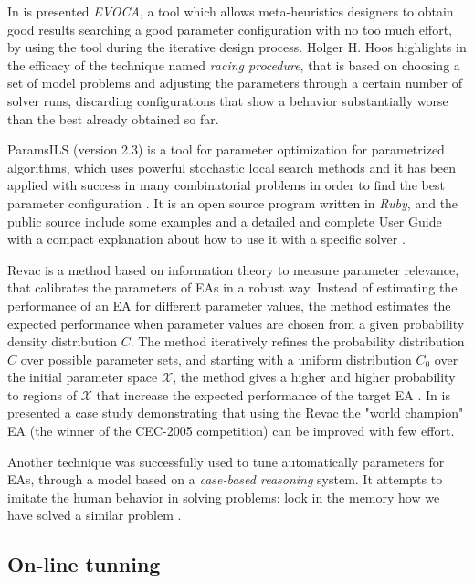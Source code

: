 In \cite{Riff2013} is presented \textit{EVOCA}, a tool which allows meta-heuristics designers to obtain good results searching a good parameter configuration with no too much effort, by using the tool during the iterative design process. Holger H. Hoos highlights in \cite{Hoos2012} the efficacy of the technique named {\it racing procedure}, that is based on choosing a set of model problems and adjusting the parameters through a certain number of solver runs, discarding configurations that show a behavior substantially worse than the best already obtained so far. 

{\sc ParamsILS} (version 2.3) is a tool for parameter optimization for parametrized algorithms, which uses powerful stochastic local search methods and it has been applied with success in many combinatorial problems in order to find the best parameter configuration \cite{Hutter2009}. It is an open source program written in {\it Ruby}, and the public source include some examples and a detailed and complete User Guide with a compact explanation about how to use it with a specific solver \cite{Hutter2008}.

{\sc Revac} is a method based on information theory to measure parameter relevance, that calibrates the parameters of EAs in a robust way. Instead of estimating the performance of an EA for different parameter values, the method estimates the expected performance when parameter values are chosen from a given probability density distribution $C$. The method iteratively refines the probability distribution $C$ over possible parameter sets, and starting with a uniform distribution $C_0$ over the initial parameter space $\mathcal{X}$, the method gives a higher and higher probability to regions of $\mathcal{X}$ that increase the expected performance of the target EA \cite{Nannen2007}. In \cite{Smit2010} is presented a case study demonstrating that using the {\sc Revac} the "world champion" EA (the winner of the CEC-2005 competition) can be improved with few effort.

Another technique was successfully used to tune automatically parameters for EAs, through a model based on a {\it case-based reasoning} system. It attempts to imitate the human behavior in solving problems: look in the memory how we have solved a similar problem \cite{Yeguas2014} .

\subsection{On-line tunning}

